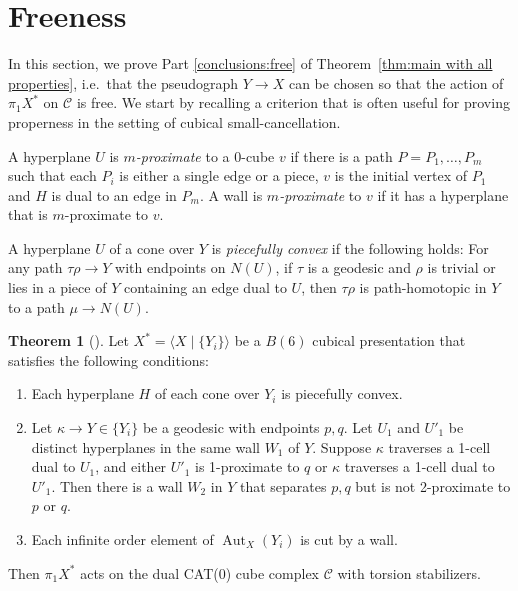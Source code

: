 \documentclass[12pt,oneside]{amsart}
\theoremstyle{definition}
\newtheorem{theorem}[thm]{Theorem}
\theoremstyle{definition}
\theoremstyle{remark}
\DeclareMathOperator{\Aut}{Aut}
\begin{document}
\section{Freeness}\label{sec:freeness}
In this section, we prove Part \eqref{conclusions:free} of Theorem~\ref{thm:main with all properties}, i.e.\ that the pseudograph $Y\to X$ can be chosen so that the action of $\pi_1 X^*$ on $\mathcal C$ is free. 
We start by recalling a criterion that is often useful for proving properness  in the setting of cubical small-cancellation.

A hyperplane $U$ is \emph{$m$-proximate} to a $0$-cube $v$ if there is a path $P =P_1, \ldots, P_m$
such that each $P_i$ is either a single edge or a piece, $v$ is the initial
vertex of $P_1$ and $H$ is dual to an edge in $P_m$. A wall is \emph{$m$-proximate} to $v$ if it
has a hyperplane that is $m$-proximate to $v$. 

 A hyperplane $U$ of a cone over $Y$ is \emph{piecefully convex} if the following holds: For any path $\tau\rho \rightarrow Y$ with endpoints on $N(U)$, if $\tau$ is a geodesic and $\rho$ is trivial or lies in a piece of $Y$ containing an edge
dual to $U$, then $\tau\rho$ is path-homotopic in $Y$ to a path $\mu \rightarrow N(U)$.


\begin{theorem}[{\cite[Thm~5.44 and Cor~5.45]{WiseBook}}]\label{thm:proper}
 Let $X^*= \langle X \mid \{Y_i\} \rangle $ be a  $B(6)$ cubical presentation that satisfies the following conditions:
 \begin{enumerate}
\item \label{item:prop.1} Each hyperplane $H$ of each cone over $Y_i$ is piecefully convex.
\item \label{item:prop.2} Let $\kappa \rightarrow Y \in \{Y_i\}$ be a geodesic with endpoints $p, q$. Let $U_1$ and $U'_1$ be distinct hyperplanes in the same wall $W_1$ of $Y$. Suppose $\kappa$ traverses a 1-cell dual to $U_1$, and either $U'_1$ is 1-proximate to $q$ or $\kappa$ traverses a 1-cell dual to $U'_1$. Then there is a wall $W_2$ in $Y$ that separates $p, q$ but is not
2-proximate to $p$ or $q$.
\item \label{item:prop.3} Each infinite order element of $\Aut_X(Y_i)$ is cut by a wall.
 \end{enumerate}

Then $\pi_1X^*$ acts on the dual CAT(0) cube complex  $\mathcal C$ with torsion stabilizers.
\end{theorem} 
\end{document}
